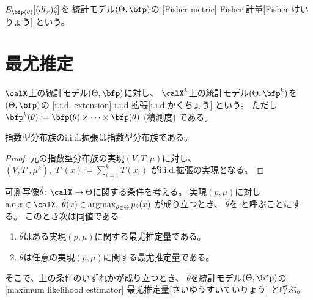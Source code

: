 \documentclass[report]{jlreq}
\begin{document}
\begin{definition}[Fisher 計量]
    $E_{\bfp(\theta)}[(dl_x)_\theta^2]$を
    統計モデル$(\Theta, \bfp)$の
    [Fisher metric]
        {Fisher 計量}[Fisher けいりょう]
    という。
\end{definition}

%
\section{最尤推定}

\begin{definition}[i.i.d.拡張]
    $\calX$上の統計モデル$(\Theta, \bfp)$に対し、
    $\calX^k$上の統計モデル$(\Theta, \bfp^k)$を
    $(\Theta, \bfp)$の
    [i.i.d. extension]
        {i.i.d.拡張}[i.i.d.かくちょう]
    という。
    ただし
    $\bfp^k(\theta)
        \coloneqq
            \bfp(\theta) \times \cdots \times \bfp(\theta)$
    (積測度) である。
\end{definition}

\begin{proposition}
    指数型分布族のi.i.d.拡張は指数型分布族である。
\end{proposition}

\begin{proof}
    元の指数型分布族の実現$(V, T, \mu)$に対し、
    $(V, T', \mu^k), \; T'(x) \coloneqq \sum_{i = 1}^k T(x_i)$
    がi.i.d.拡張の実現となる。
\end{proof}

\begin{propdef}[最尤推定量]
    可測写像$\hat{\theta} \colon \calX \to \Theta$に関する条件を考える。
    実現$(p, \mu)$に対し
    $\text{a.e.} x \in \calX, \;
        \hat{\theta}(x) \in \argmax_{\theta \in \Theta} p_\theta(x)$
    が成り立つとき、
    $\hat{\theta}$を
    と呼ぶことにする。
    このとき次は同値である:
    \begin{enumerate}
        \item $\hat{\theta}$はある実現$(p, \mu)$に関する最尤推定量である。
        \item $\hat{\theta}$は任意の実現$(p, \mu)$に関する最尤推定量である。
    \end{enumerate}
    そこで、上の条件のいずれかが成り立つとき、
    $\hat{\theta}$を統計モデル$(\Theta, \bfp)$の
    [maximum likelihood estimator]
        {最尤推定量}[さいゆうすいていりょう]
    と呼ぶ。
\end{propdef}
\end{document}
